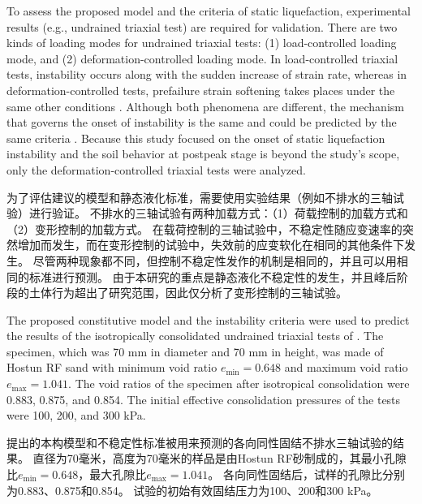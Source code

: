 \begin{ParaColumn}
    
    To assess the proposed model and the criteria of static liquefaction, experimental results (e.g., undrained triaxial test) are required for validation. There are two kinds of loading modes for undrained triaxial tests: (1) load-controlled loading mode, and (2) deformation-controlled loading mode. In load-controlled triaxial tests, instability occurs along with the sudden increase of strain rate, whereas in deformation-controlled tests, prefailure strain softening takes places under the same other conditions \citep{Chu2001}. Although both phenomena are different, the mechanism that governs the onset of instability is the same and could be predicted by the same criteria \citep{Chu2001, Chu2009}. Because this study focused on the onset of static liquefaction instability and the soil behavior at postpeak stage is beyond the study’s scope, only the deformation-controlled triaxial tests were analyzed.

    \switchcolumn

    为了评估建议的模型和静态液化标准，需要使用实验结果（例如不排水的三轴试验）进行验证。 不排水的三轴试验有两种加载方式：（1）荷载控制的加载方式和（2）变形控制的加载方式。 在载荷控制的三轴试验中，不稳定性随应变速率的突然增加而发生，而在变形控制的试验中，失效前的应变软化在相同的其他条件下发生\citep{Chu2001}。 尽管两种现象都不同，但控制不稳定性发作的机制是相同的，并且可以用相同的标准进行预测\citep{Chu2001, Chu2009}。 由于本研究的重点是静态液化不稳定性的发生，并且峰后阶段的土体行为超出了研究范围，因此仅分析了变形控制的三轴试验。


    The proposed constitutive model and the instability criteria were used to predict the results of the isotropically consolidated undrained triaxial tests of \citet{Doanh1997}. The specimen, which was 70 mm in diameter and 70 mm in height, was made of Hostun RF sand with minimum void ratio $e_{\min} = 0.648$ and maximum void ratio $e_{\max} = 1.041$. The void ratios of the specimen after isotropical consolidation were 0.883, 0.875, and 0.854. The initial effective consolidation pressures of the tests were 100, 200, and 300 kPa.

    \switchcolumn

    提出的本构模型和不稳定性标准被用来预测\citet{Doanh1997}的各向同性固结不排水三轴试验的结果。 直径为70毫米，高度为70毫米的样品是由Hostun RF砂制成的，其最小孔隙比$e_{\min} = 0.648$，最大孔隙比$e_{\max} = 1.041$。 各向同性固结后，试样的孔隙比分别为0.883、0.875和0.854。 试验的初始有效固结压力为100、200和300 kPa。


\end{ParaColumn}
